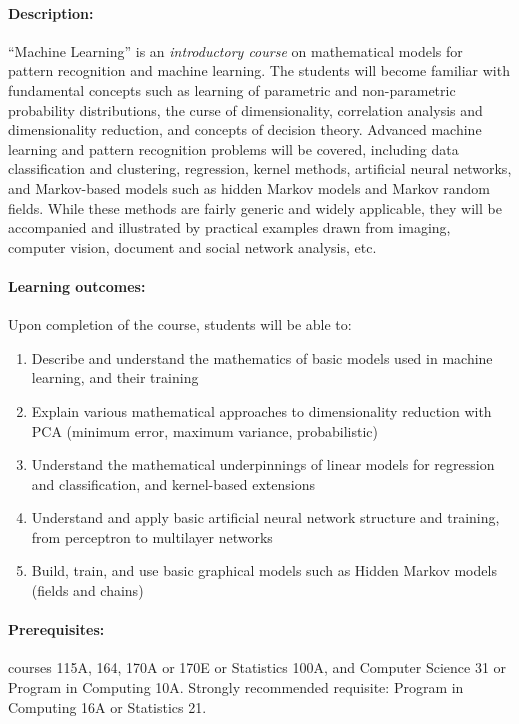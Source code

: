 \documentclass[11pt,letter]{article}
\begin{document}
\paragraph{Description:} ``Machine Learning'' is an \emph{introductory course} on mathematical models for pattern recognition and machine learning. The students will become familiar with fundamental concepts such as learning of parametric and non-parametric probability distributions, the curse of dimensionality, correlation analysis and dimensionality reduction,  and concepts of decision theory. Advanced machine learning and pattern recognition problems will be covered, including data classification and clustering, regression, kernel methods, artificial neural networks, and Markov-based models such as hidden Markov models and Markov random fields. While these methods are fairly generic and widely applicable, they will be accompanied and illustrated by practical examples drawn from imaging, computer vision, document and social network analysis, etc.

\paragraph{Learning outcomes:} Upon completion of the course, students will be able to:
\begin{enumerate}\small\setlength\itemsep{-0.2em}
\item Describe and understand the mathematics of basic models used in machine learning, and their training
\item Explain various mathematical approaches to dimensionality reduction with PCA (minimum error, maximum variance, probabilistic)
\item Understand the mathematical underpinnings of linear models for regression and classification, and kernel-based extensions
\item Understand and apply basic artificial neural network structure and training, from perceptron to multilayer networks
\item Build, train, and use basic graphical models such as Hidden Markov models (fields and chains)
\end{enumerate}

\paragraph{Prerequisites:}  courses 115A, 164, 170A or 170E or Statistics 100A, and Computer Science 31 or Program in Computing 10A. Strongly recommended requisite: Program in Computing 16A or Statistics 21. 
\end{document}
